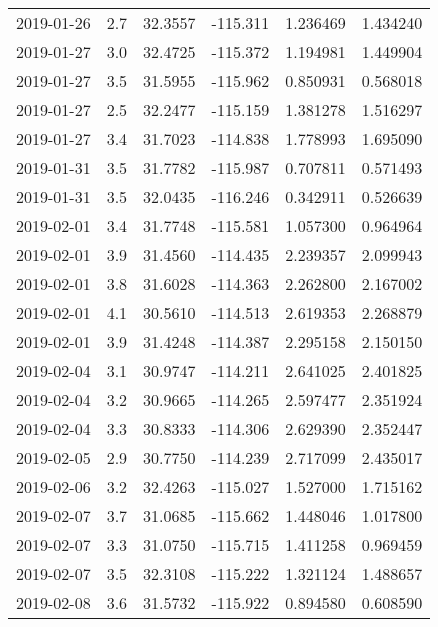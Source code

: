 \begin{tabular}{lrrrrr}
2019-01-26 &       2.7 &  32.3557 &  -115.311 &         1.236469 &         1.434240 \\
2019-01-27 &       3.0 &  32.4725 &  -115.372 &         1.194981 &         1.449904 \\
2019-01-27 &       3.5 &  31.5955 &  -115.962 &         0.850931 &         0.568018 \\
2019-01-27 &       2.5 &  32.2477 &  -115.159 &         1.381278 &         1.516297 \\
2019-01-27 &       3.4 &  31.7023 &  -114.838 &         1.778993 &         1.695090 \\
2019-01-31 &       3.5 &  31.7782 &  -115.987 &         0.707811 &         0.571493 \\
2019-01-31 &       3.5 &  32.0435 &  -116.246 &         0.342911 &         0.526639 \\
2019-02-01 &       3.4 &  31.7748 &  -115.581 &         1.057300 &         0.964964 \\
2019-02-01 &       3.9 &  31.4560 &  -114.435 &         2.239357 &         2.099943 \\
2019-02-01 &       3.8 &  31.6028 &  -114.363 &         2.262800 &         2.167002 \\
2019-02-01 &       4.1 &  30.5610 &  -114.513 &         2.619353 &         2.268879 \\
2019-02-01 &       3.9 &  31.4248 &  -114.387 &         2.295158 &         2.150150 \\
2019-02-04 &       3.1 &  30.9747 &  -114.211 &         2.641025 &         2.401825 \\
2019-02-04 &       3.2 &  30.9665 &  -114.265 &         2.597477 &         2.351924 \\
2019-02-04 &       3.3 &  30.8333 &  -114.306 &         2.629390 &         2.352447 \\
2019-02-05 &       2.9 &  30.7750 &  -114.239 &         2.717099 &         2.435017 \\
2019-02-06 &       3.2 &  32.4263 &  -115.027 &         1.527000 &         1.715162 \\
2019-02-07 &       3.7 &  31.0685 &  -115.662 &         1.448046 &         1.017800 \\
2019-02-07 &       3.3 &  31.0750 &  -115.715 &         1.411258 &         0.969459 \\
2019-02-07 &       3.5 &  32.3108 &  -115.222 &         1.321124 &         1.488657 \\
2019-02-08 &       3.6 &  31.5732 &  -115.922 &         0.894580 &         0.608590 \\

\end{tabular}
